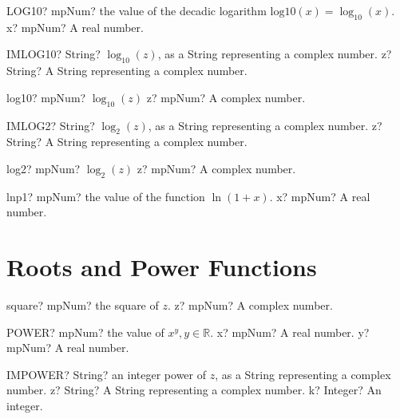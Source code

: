 \documentclass[12pt,a4paper,openany]{book}
\begin{document}
\begin{mpFunctionsExtract}
\mpWorksheetFunctionOneNotImplemented
{LOG10? mpNum? the value of the decadic logarithm $\text{log10}(x) = \log_{10}(x)$.}
{x? mpNum? A real number.}
\end{mpFunctionsExtract}

\begin{mpFunctionsExtract}
\mpWorksheetFunctionOneNotImplemented
{IMLOG10? String? $\log_{10}(z)$, as a String representing a complex number.}
{z? String? A String representing a complex number.}
\end{mpFunctionsExtract}

\begin{mpFunctionsExtract}
\mpFunctionOne
{log10? mpNum? $\log_{10}(z)$}
{z? mpNum? A complex number.}
\end{mpFunctionsExtract}

\begin{mpFunctionsExtract}
\mpWorksheetFunctionOneNotImplemented
{IMLOG2? String? $\log_{2}(z)$, as a String representing a complex number.}
{z? String? A String representing a complex number.}
\end{mpFunctionsExtract}

\begin{mpFunctionsExtract}
\mpFunctionOne
{log2? mpNum? $\log_{2}(z)$}
{z? mpNum? A complex number.}
\end{mpFunctionsExtract}

\begin{mpFunctionsExtract}
\mpFunctionOne
{lnp1? mpNum? the value of the function $\ln(1+x)$.}
{x? mpNum? A real number.}
\end{mpFunctionsExtract}

\section{Roots and Power Functions}

\begin{mpFunctionsExtract}
\mpFunctionOne
{square? mpNum? the square of $z$.}
{z? mpNum? A complex number.}
\end{mpFunctionsExtract}

\begin{mpFunctionsExtract}
\mpWorksheetFunctionTwoNotImplemented
{POWER? mpNum? the value of $x^y, y \in  \mathbb{R}$.}
{x? mpNum? A real number.}
{y? mpNum? A real number.}
\end{mpFunctionsExtract}

\begin{mpFunctionsExtract}
\mpWorksheetFunctionTwoNotImplemented
{IMPOWER? String? an integer power of $z$, as a String representing a complex number.}
{z? String? A String representing a complex number.}
{k? Integer? An integer.}
\end{mpFunctionsExtract}
\end{document}
